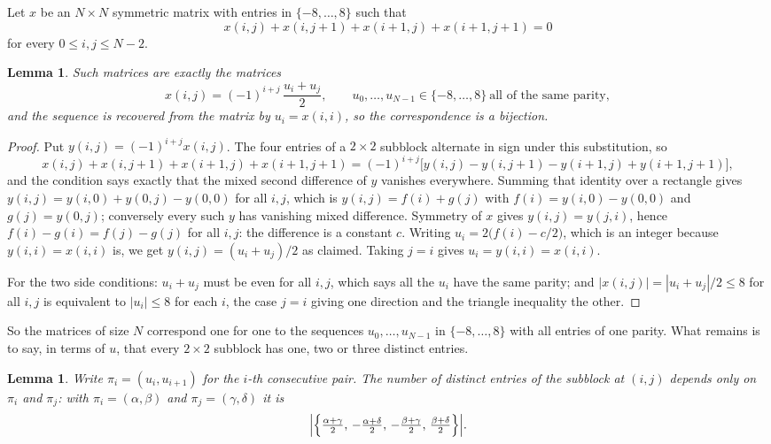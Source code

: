 \documentclass[11pt,a4paper]{article}
\theoremstyle{plain}
\newtheorem{lemma}[theorem]{Lemma}
\theoremstyle{definition}
\begin{document}
Let $x$ be an $N\times N$ symmetric matrix with entries in $\{-8,\dots,8\}$ such that
\[
x(i,j)+x(i,j{+}1)+x(i{+}1,j)+x(i{+}1,j{+}1)=0
\]
for every $0\le i,j\le N-2$.

\begin{lemma}\label{lem:solve}
Such matrices are exactly the matrices
\[
x(i,j)=(-1)^{i+j}\,\frac{u_i+u_j}{2},
\qquad u_0,\dots,u_{N-1}\in\{-8,\dots,8\}\ \text{all of the same parity},
\]
and the sequence is recovered from the matrix by $u_i=x(i,i)$, so the correspondence is a
bijection.
\end{lemma}

\begin{proof}
Put $y(i,j)=(-1)^{i+j}x(i,j)$. The four entries of a $2\times2$ subblock alternate in sign
under this substitution, so
\[
x(i,j)+x(i,j{+}1)+x(i{+}1,j)+x(i{+}1,j{+}1)
=(-1)^{i+j}\bigl[y(i,j)-y(i,j{+}1)-y(i{+}1,j)+y(i{+}1,j{+}1)\bigr],
\]
and the condition says exactly that the mixed second difference of $y$ vanishes everywhere.
Summing that identity over a rectangle gives
$y(i,j)=y(i,0)+y(0,j)-y(0,0)$ for all $i,j$, which is $y(i,j)=f(i)+g(j)$ with
$f(i)=y(i,0)-y(0,0)$ and $g(j)=y(0,j)$; conversely every such $y$ has vanishing mixed
difference. Symmetry of $x$ gives $y(i,j)=y(j,i)$, hence $f(i)-g(i)=f(j)-g(j)$ for all $i,j$:
the difference is a constant $c$. Writing $u_i=2\bigl(f(i)-c/2\bigr)$, which is an integer
because $y(i,i)=x(i,i)$ is, we get $y(i,j)=(u_i+u_j)/2$ as claimed. Taking $j=i$ gives
$u_i=y(i,i)=x(i,i)$.

For the two side conditions: $u_i+u_j$ must be even for all $i,j$, which says all the $u_i$ have
the same parity; and $|x(i,j)|=|u_i+u_j|/2\le8$ for all $i,j$ is equivalent to $|u_i|\le8$
for each $i$, the case $j=i$ giving one direction and the triangle inequality the other.
\end{proof}

So the matrices of size $N$ correspond one for one to the sequences $u_0,\dots,u_{N-1}$ in
$\{-8,\dots,8\}$ with all entries of one parity. What remains is to say, in terms of $u$,
that every $2\times2$ subblock has one, two or three distinct entries.

\begin{lemma}\label{lem:block}
Write $\pi_i=(u_i,u_{i+1})$ for the $i$-th consecutive pair. The number of distinct entries of
the subblock at $(i,j)$ depends only on $\pi_i$ and $\pi_j$: with $\pi_i=(\alpha,\beta)$ and
$\pi_j=(\gamma,\delta)$ it is
\[
\Bigl|\Bigl\{\tfrac{\alpha+\gamma}{2},\,-\tfrac{\alpha+\delta}{2},\,
-\tfrac{\beta+\gamma}{2},\,\tfrac{\beta+\delta}{2}\Bigr\}\Bigr| .
\]
\end{lemma}
\end{document}
